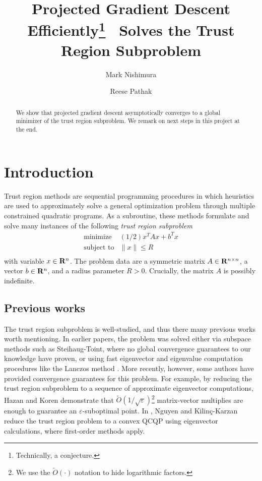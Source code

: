 \documentclass[11pt]{article}
\title{Projected Gradient Descent Efficiently\footnote{Technically, a conjecture.}~ Solves the Trust Region Subproblem}
\author{Mark Nishimura \and Reese Pathak}
\let\epsilon\varepsilon
\begin{document}
\maketitle

\begin{abstract}
We show that projected gradient descent asymptotically converges to a global minimizer of 
the trust region subproblem.
We remark on next steps in this project at the end.
\end{abstract}


\section{Introduction}
Trust region methods are sequential programming procedures in which heuristics are used to approximately solve a general optimization problem through multiple constrained quadratic programs. As a subroutine, these methods formulate and solve many instances of the following \emph{trust region subproblem}
\begin{equation}\label{problem:TR}
\begin{array}{ll} 
\mbox{minimize} & (1/2)x^TAx + b^T x \\
\mbox{subject to} & 
\|x\| \leq R\\
\end{array}
\end{equation}
with variable $x \in \mathbf{R}^n$. 
The problem data are a symmetric matrix $A \in \mathbf{R}^{n \times n}$, a vector $b \in \mathbf{R}^n$, and a radius parameter $R > 0$. Crucially, the matrix $A$ is possibly indefinite. 
\subsection{Previous works}
The trust region subproblem is well-studied, and thus there many previous works worth mentioning. In earlier papers, the problem was solved either via subspace methods such as Steihaug-Toint, where no global convergence guarantees to our knowledge have proven, or using fast eigenvector and eigenvalue computation procedures like the Lanczos method \cite{conn2000, erway2009, gould1999, gould2010}. More recently, however, some authors have provided convergence guarantees for this problem. For example, by reducing the trust region subproblem to a sequence of approximate eigenvector computations, Hazan and Koren \cite{hazan2016}
demonstrate that $\tilde O(1/\sqrt{\epsilon})$\footnote{We use the $\tilde O(\cdot)$ notation to hide logarithmic factors.} matrix-vector multiplies are enough to guarantee an 
$\epsilon$-suboptimal point. In \cite{nguyen2017}, Nguyen and Kilin{\c{c}}{-}Karzan reduce the trust region problem to a convex QCQP using eigenvector calculations, where first-order methods apply. 
\end{document}

